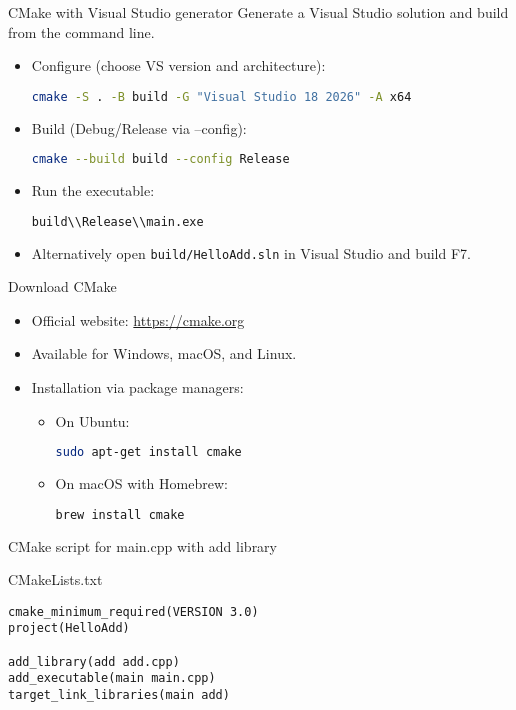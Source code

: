 \documentclass{beamer}
\begin{document}
\begin{frame}[fragile]{CMake with Visual Studio generator}
  Generate a Visual Studio solution and build from the command line.
  \begin{itemize}
    \item Configure (choose VS version and architecture):
    \begin{lstlisting}[language=bash]
cmake -S . -B build -G "Visual Studio 18 2026" -A x64
    \end{lstlisting}
    \item Build (Debug/Release via --config):
    \begin{lstlisting}[language=bash]
cmake --build build --config Release
    \end{lstlisting}
    \item Run the executable:
    \begin{lstlisting}[language=bash]
build\\Release\\main.exe
    \end{lstlisting}
    \item Alternatively open \texttt{build/HelloAdd.sln} in Visual Studio and build F7.
  \end{itemize}
\end{frame}

\begin{frame}[fragile]{Download CMake}
  \begin{itemize}
    \item Official website: \url{https://cmake.org}
    \item Available for Windows, macOS, and Linux.
    \item Installation via package managers:
    \begin{itemize}
      \item On Ubuntu:
      \begin{lstlisting}[language=bash]
sudo apt-get install cmake
      \end{lstlisting}
      \item On macOS with Homebrew:
      \begin{lstlisting}[language=bash]
brew install cmake
      \end{lstlisting}
    \end{itemize}
  \end{itemize}
\end{frame}

\begin{frame}[fragile]{CMake script for main.cpp with add library}
  \begin{block}{CMakeLists.txt}
    \begin{lstlisting}
cmake_minimum_required(VERSION 3.0)
project(HelloAdd)

add_library(add add.cpp)
add_executable(main main.cpp)
target_link_libraries(main add)
    \end{lstlisting}
  \end{block}
\end{frame}
\end{document}
